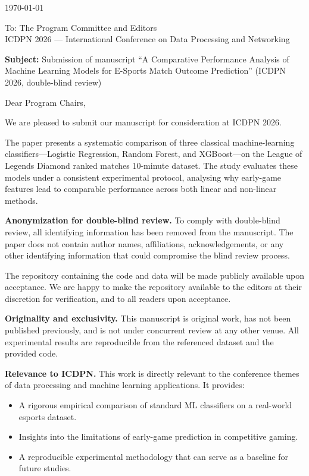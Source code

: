 \documentclass[11pt]{article}
\begin{document}
\thispagestyle{empty}

\noindent\today

\bigskip

\noindent To: The Program Committee and Editors\\
ICDPN 2026 --- International Conference on Data Processing and Networking

\bigskip

\noindent\textbf{Subject:} Submission of manuscript ``A Comparative Performance Analysis of Machine Learning Models for E-Sports Match Outcome Prediction'' (ICDPN 2026, double-blind review)

\bigskip

\noindent Dear Program Chairs,

We are pleased to submit our manuscript for consideration at ICDPN 2026.

The paper presents a systematic comparison of three classical machine-learning classifiers---Logistic Regression, Random Forest, and XGBoost---on the League of Legends Diamond ranked matches 10-minute dataset. The study evaluates these models under a consistent experimental protocol, analysing why early-game features lead to comparable performance across both linear and non-linear methods.

\bigskip

\noindent\textbf{Anonymization for double-blind review.}
To comply with double-blind review, all identifying information has been removed from the manuscript. The paper does not contain author names, affiliations, acknowledgements, or any other identifying information that could compromise the blind review process.

The repository containing the code and data will be made publicly available upon acceptance. We are happy to make the repository available to the editors at their discretion for verification, and to all readers upon acceptance.

\bigskip

\noindent\textbf{Originality and exclusivity.} This manuscript is original work, has not been published previously, and is not under concurrent review at any other venue. All experimental results are reproducible from the referenced dataset and the provided code.

\bigskip

\noindent\textbf{Relevance to ICDPN.} This work is directly relevant to the conference themes of data processing and machine learning applications. It provides:
\begin{itemize}
\item A rigorous empirical comparison of standard ML classifiers on a real-world esports dataset.
\item Insights into the limitations of early-game prediction in competitive gaming.
\item A reproducible experimental methodology that can serve as a baseline for future studies.
\end{itemize}
\end{document}
